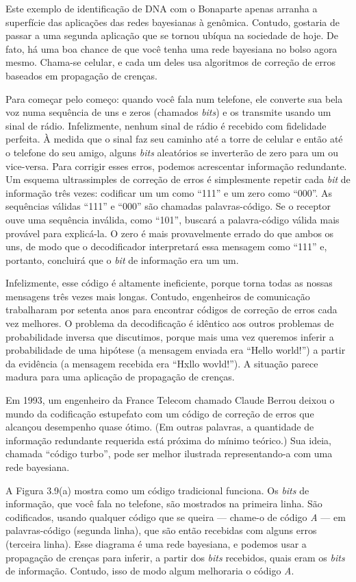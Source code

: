 \documentclass[11pt,a5paper,twoside]{book}
\begin{document}
Este exemplo de identificação de DNA com o Bonaparte apenas arranha a superfície das aplicações das redes bayesianas à genômica. Contudo, gostaria de passar a uma segunda aplicação que se tornou ubíqua na sociedade de hoje. De fato, há uma boa chance de que você tenha uma rede bayesiana no bolso agora mesmo. Chama-se celular, e cada um deles usa algoritmos de correção de erros baseados em propagação de crenças.

Para começar pelo começo: quando você fala num telefone, ele converte sua bela voz numa sequência de uns e zeros (chamados \textit{bits}) e os transmite usando um sinal de rádio. Infelizmente, nenhum sinal de rádio é recebido com fidelidade perfeita. À medida que o sinal faz seu caminho até a torre de celular e então até o telefone do seu amigo, alguns \textit{bits} aleatórios se inverterão de zero para um ou vice-versa. Para corrigir esses erros, podemos acrescentar informação redundante. Um esquema ultrassimples de correção de erros é simplesmente repetir cada \textit{bit} de informação três vezes: codificar um um como “111” e um zero como “000”. As sequências válidas “111” e “000” são chamadas palavras-código. Se o receptor ouve uma sequência inválida, como “101”, buscará a palavra-código válida mais provável para explicá-la. O zero é mais provavelmente errado do que ambos os uns, de modo que o decodificador interpretará essa mensagem como “111” e, portanto, concluirá que o \textit{bit} de informação era um um.

Infelizmente, esse código é altamente ineficiente, porque torna todas as nossas mensagens três vezes mais longas. Contudo, engenheiros de comunicação trabalharam por setenta anos para encontrar códigos de correção de erros cada vez melhores. O problema da decodificação é idêntico aos outros problemas de probabilidade inversa que discutimos, porque mais uma vez queremos inferir a probabilidade de uma hipótese (a mensagem enviada era “Hello world!”) a partir da evidência (a mensagem recebida era “Hxllo wovld!”). A situação parece madura para uma aplicação de propagação de crenças.

Em 1993, um engenheiro da France Telecom chamado Claude Berrou deixou o mundo da codificação estupefato com um código de correção de erros que alcançou desempenho quase ótimo. (Em outras palavras, a quantidade de informação redundante requerida está próxima do mínimo teórico.) Sua ideia, chamada “código turbo”, pode ser melhor ilustrada representando-a com uma rede bayesiana.

A Figura 3.9(a) mostra como um código tradicional funciona. Os \textit{bits} de informação, que você fala no telefone, são mostrados na primeira linha. São codificados, usando qualquer código que se queira — chame-o de código \textit{A} — em palavras-código (segunda linha), que são então recebidas com alguns erros (terceira linha). Esse diagrama é uma rede bayesiana, e podemos usar a propagação de crenças para inferir, a partir dos \textit{bits} recebidos, quais eram os \textit{bits} de informação. Contudo, isso de modo algum melhoraria o código \textit{A}.
\end{document}
